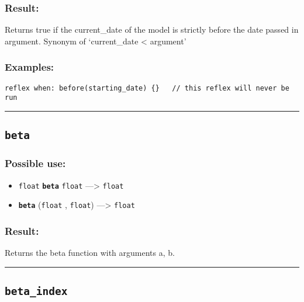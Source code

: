 \documentclass[]{book}
\providecommand{\tightlist}{%
  \setlength{\itemsep}{0pt}\setlength{\parskip}{0pt}}
\theoremstyle{definition}
\theoremstyle{definition}
\theoremstyle{definition}
\theoremstyle{remark}
\begin{document}
\subsubsection{Result:}\label{result-63}

Returns true if the current\_date of the model is strictly before the
date passed in argument. Synonym of `current\_date \textless{} argument'

\subsubsection{Examples:}\label{examples-51}

\begin{verbatim}
reflex when: before(starting_date) {}   // this reflex will never be run 
\end{verbatim}

\begin{center}\rule{0.5\linewidth}{\linethickness}\end{center}

\subsection{\texorpdfstring{\texttt{beta}}{beta}}\label{beta}

\subsubsection{Possible use:}\label{possible-use-65}

\begin{itemize}
\tightlist
\item
  \texttt{float} \textbf{\texttt{beta}} \texttt{float} ---\textgreater{}
  \texttt{float}
\item
  \textbf{\texttt{beta}} (\texttt{float} , \texttt{float})
  ---\textgreater{} \texttt{float}
\end{itemize}

\subsubsection{Result:}\label{result-64}

Returns the beta function with arguments a, b.

\begin{center}\rule{0.5\linewidth}{\linethickness}\end{center}

\subsection{\texorpdfstring{\texttt{beta\_index}}{beta\_index}}\label{beta_index}
\end{document}
